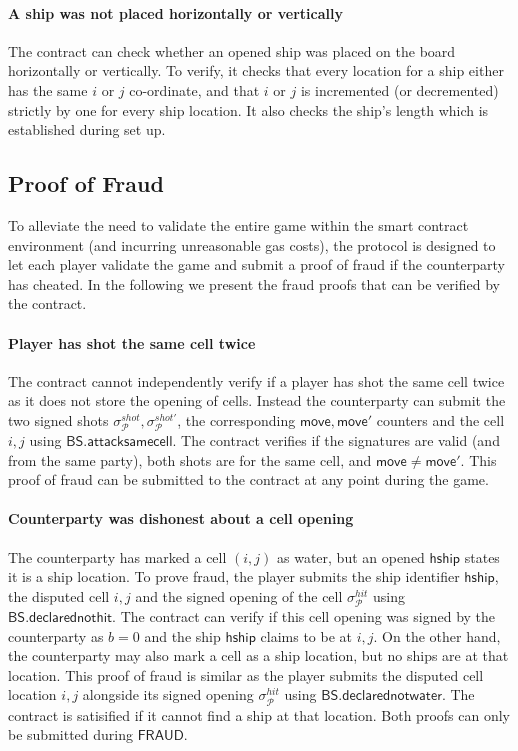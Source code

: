 \documentclass{llncs}
\newcommand{\gamefraud}{\mathsf{FRAUD}}
\newcommand{\hship}{\mathsf{hship}}
\newcommand{\participant}{\mathcal{P}}
\newcommand{\battleshipdeclarednothit}{\mathsf{BS.declarednothit}}
\newcommand{\battleshipdeclarednotwater}{\mathsf{BS.declarednotwater}}
\newcommand{\battleshipsamecell}{\mathsf{BS.attacksamecell}}
\begin{document}
\paragraph{A ship was not placed  horizontally or vertically}\label{sec:vertical}
The contract can check whether an opened ship was placed on the board horizontally or vertically. 
To verify, it checks that every location for a ship either has the same $i$ or $j$ co-ordinate, and that $i$ or $j$ is incremented (or decremented) strictly by one for every ship location. 
It also checks the ship's length which is established during set up. 

\subsection{Proof of Fraud}  \label{sec:prooffraud}

To alleviate the need to validate the entire game within the smart contract environment (and incurring unreasonable gas costs), the protocol is designed to let each player validate the game and submit a proof of fraud if the counterparty has cheated. 
In the following we present the fraud proofs that can be verified by the contract. 

\paragraph{Player has shot the same cell twice} 
The contract cannot independently verify if a player has shot the same cell twice as it does not store the opening of cells.
Instead the counterparty can submit the two signed shots $\sigma^{shot}_{\participant},\sigma^{shot'}_{\participant}$, the corresponding $\mathsf{move},\mathsf{move}'$ counters and the cell $i,j$ using $\battleshipsamecell$. 
The contract verifies if the signatures are valid (and from the same party), both shots are for the same cell, and $\mathsf{move}\neq\mathsf{move}'$. 
This proof of fraud can be submitted to the contract at any point during the game. 

\paragraph{Counterparty was dishonest about a cell opening}
The counterparty has marked a cell $(i,j)$ as water, but an opened $\hship$ states it is a ship location. 
To prove fraud, the player submits the ship identifier $\hship$, the disputed cell $i,j$ and the signed opening of the cell $\sigma^{hit}_{\participant}$ using $\battleshipdeclarednothit$.
The contract can verify if this cell opening was signed by the counterparty as $b = 0$ and the ship $\hship$ claims to be at $i,j$.   
On the other hand, the counterparty may also mark a cell as a ship location,  but no ships are at that location.
This proof of fraud is similar as the player submits the disputed cell location $i,j$ alongside its signed opening $\sigma^{hit}_{\participant}$ using $\battleshipdeclarednotwater$. 
The contract is satisified if it cannot find a ship at that location. 
Both proofs can only be submitted during $\gamefraud$. 
\end{document}
